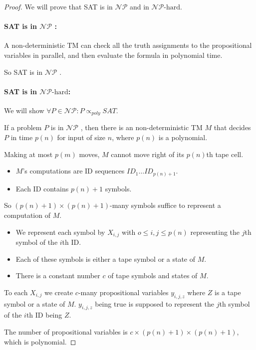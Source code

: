 \documentclass[a4paper,11pt]{report}
\newcommand{\NPc}{\ensuremath{\mathcal{NP}} }
\newcommand{\NPHc}{\ensuremath{\mathcal{NP}\text{-hard}}}
\begin{document}
\begin{proof}
  We will prove that SAT is in \NPc and in \NPHc.

  \paragraph{SAT is in \NPc :} A non-deterministic TM can check all the truth
  assignments to the propositional variables in parallel, and then evaluate the
  formula in polynomial time.

  So SAT is in \NPc.

  \paragraph{SAT is in \NPHc :} We will show $\forall P \in \NPc : P
  \propto_{poly} SAT$.

  If a problem $P$ is in \NPc, then there is an non-deterministic TM $M$ that
  decides $P$ in time $p(n)$ for input of size $n$, where $p(n)$ is a
  polynomial.

  Making at most $p(m)$ moves, $M$ cannot move right of its $p(n)$th tape cell.

  \begin{itemize}
  \item $M$'s computations are ID sequences $ID_1\dots ID_{p(n)+1}$.
  \item Each ID contains $p(n)+1$ symbols.
  \end{itemize}

  So $(p(n) + 1) \times (p(n) + 1)$-many symbols suffice to represent a
  computation of $M$.

  \begin{itemize}
  \item We represent each symbol by $X_{i,j}$ with $o \leq i,j \leq p(n)$
    representing the $j$th symbol of the $i$th ID.
  \item Each of these symbols is either a tape symbol or a state of $M$.
  \item There is a constant number $c$ of tape symbols and states of $M$.
  \end{itemize}

  To each $X_{i,j}$ we create $c$-many propositional variables $y_{i,j,z}$ where
  $Z$ is a tape symbol or a state of $M$. $y_{i,j,z}$ being true is supposed to
  represent the $j$th symbol of the $i$th ID being $Z$.

  The number of propositional variables is $c \times (p(n)+1) \times (p(n)+1)$,
  which is polynomial.


\end{proof}
\end{document}
